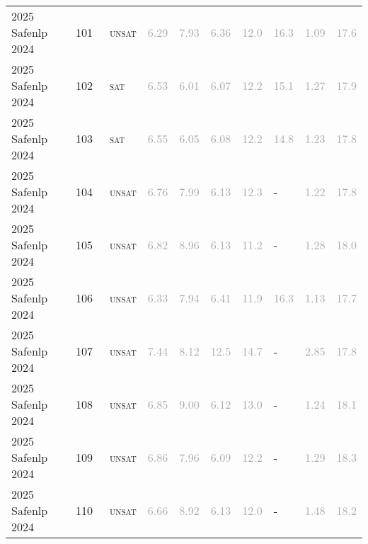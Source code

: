 \begin{center}
{\begin{longtable}{@{}llllllllll@{}}
2025 Safenlp 2024 & 101 & ~\textsc{unsat} & \textcolor{darkgray}{6.29} & \textcolor{darkgray}{7.93} & \textcolor{darkgray}{6.36} & \textcolor{darkgray}{12.0} & \textcolor{darkgray}{16.3} & \textcolor{darkgray}{1.09} & \textcolor{darkgray}{17.6} \\
2025 Safenlp 2024 & 102 & ~\textsc{sat} & \textcolor{darkgray}{6.53} & \textcolor{darkgray}{6.01} & \textcolor{darkgray}{6.07} & \textcolor{darkgray}{12.2} & \textcolor{darkgray}{15.1} & \textcolor{darkgray}{1.27} & \textcolor{darkgray}{17.9} \\
2025 Safenlp 2024 & 103 & ~\textsc{sat} & \textcolor{darkgray}{6.55} & \textcolor{darkgray}{6.05} & \textcolor{darkgray}{6.08} & \textcolor{darkgray}{12.2} & \textcolor{darkgray}{14.8} & \textcolor{darkgray}{1.23} & \textcolor{darkgray}{17.8} \\
2025 Safenlp 2024 & 104 & ~\textsc{unsat} & \textcolor{darkgray}{6.76} & \textcolor{darkgray}{7.99} & \textcolor{darkgray}{6.13} & \textcolor{darkgray}{12.3} & - & \textcolor{darkgray}{1.22} & \textcolor{darkgray}{17.8} \\
2025 Safenlp 2024 & 105 & ~\textsc{unsat} & \textcolor{darkgray}{6.82} & \textcolor{darkgray}{8.96} & \textcolor{darkgray}{6.13} & \textcolor{darkgray}{11.2} & - & \textcolor{darkgray}{1.28} & \textcolor{darkgray}{18.0} \\
2025 Safenlp 2024 & 106 & ~\textsc{unsat} & \textcolor{darkgray}{6.33} & \textcolor{darkgray}{7.94} & \textcolor{darkgray}{6.41} & \textcolor{darkgray}{11.9} & \textcolor{darkgray}{16.3} & \textcolor{darkgray}{1.13} & \textcolor{darkgray}{17.7} \\
2025 Safenlp 2024 & 107 & ~\textsc{unsat} & \textcolor{darkgray}{7.44} & \textcolor{darkgray}{8.12} & \textcolor{darkgray}{12.5} & \textcolor{darkgray}{14.7} & - & \textcolor{darkgray}{2.85} & \textcolor{darkgray}{17.8} \\
2025 Safenlp 2024 & 108 & ~\textsc{unsat} & \textcolor{darkgray}{6.85} & \textcolor{darkgray}{9.00} & \textcolor{darkgray}{6.12} & \textcolor{darkgray}{13.0} & - & \textcolor{darkgray}{1.24} & \textcolor{darkgray}{18.1} \\
2025 Safenlp 2024 & 109 & ~\textsc{unsat} & \textcolor{darkgray}{6.86} & \textcolor{darkgray}{7.96} & \textcolor{darkgray}{6.09} & \textcolor{darkgray}{12.2} & - & \textcolor{darkgray}{1.29} & \textcolor{darkgray}{18.3} \\
2025 Safenlp 2024 & 110 & ~\textsc{unsat} & \textcolor{darkgray}{6.66} & \textcolor{darkgray}{8.92} & \textcolor{darkgray}{6.13} & \textcolor{darkgray}{12.0} & - & \textcolor{darkgray}{1.48} & \textcolor{darkgray}{18.2} \\

\end{longtable}}
\end{center}
